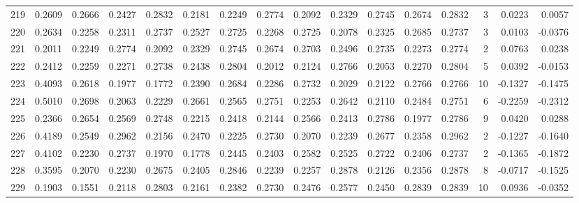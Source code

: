 \begin{tabular}{lrrrrrrrrrrrrrrr}
219 &      0.2609 &  0.2666 &  0.2427 &  0.2832 &  0.2181 &  0.2249 &  0.2774 &  0.2092 &  0.2329 &  0.2745 &   0.2674 &     0.2832 &      3 &                    0.0223 &                     0.0057 \\
220 &      0.2634 &  0.2258 &  0.2311 &  0.2737 &  0.2527 &  0.2725 &  0.2268 &  0.2725 &  0.2078 &  0.2325 &   0.2685 &     0.2737 &      3 &                    0.0103 &                    -0.0376 \\
221 &      0.2011 &  0.2249 &  0.2774 &  0.2092 &  0.2329 &  0.2745 &  0.2674 &  0.2703 &  0.2496 &  0.2735 &   0.2273 &     0.2774 &      2 &                    0.0763 &                     0.0238 \\
222 &      0.2412 &  0.2259 &  0.2271 &  0.2738 &  0.2438 &  0.2804 &  0.2012 &  0.2124 &  0.2766 &  0.2053 &   0.2270 &     0.2804 &      5 &                    0.0392 &                    -0.0153 \\
223 &      0.4093 &  0.2618 &  0.1977 &  0.1772 &  0.2390 &  0.2684 &  0.2286 &  0.2732 &  0.2029 &  0.2122 &   0.2766 &     0.2766 &     10 &                   -0.1327 &                    -0.1475 \\
224 &      0.5010 &  0.2698 &  0.2063 &  0.2229 &  0.2661 &  0.2565 &  0.2751 &  0.2253 &  0.2642 &  0.2110 &   0.2484 &     0.2751 &      6 &                   -0.2259 &                    -0.2312 \\
225 &      0.2366 &  0.2654 &  0.2569 &  0.2748 &  0.2215 &  0.2418 &  0.2144 &  0.2566 &  0.2413 &  0.2786 &   0.1977 &     0.2786 &      9 &                    0.0420 &                     0.0288 \\
226 &      0.4189 &  0.2549 &  0.2962 &  0.2156 &  0.2470 &  0.2225 &  0.2730 &  0.2070 &  0.2239 &  0.2677 &   0.2358 &     0.2962 &      2 &                   -0.1227 &                    -0.1640 \\
227 &      0.4102 &  0.2230 &  0.2737 &  0.1970 &  0.1778 &  0.2445 &  0.2403 &  0.2582 &  0.2525 &  0.2722 &   0.2406 &     0.2737 &      2 &                   -0.1365 &                    -0.1872 \\
228 &      0.3595 &  0.2070 &  0.2230 &  0.2675 &  0.2405 &  0.2846 &  0.2239 &  0.2257 &  0.2878 &  0.2126 &   0.2356 &     0.2878 &      8 &                   -0.0717 &                    -0.1525 \\
229 &      0.1903 &  0.1551 &  0.2118 &  0.2803 &  0.2161 &  0.2382 &  0.2730 &  0.2476 &  0.2577 &  0.2450 &   0.2839 &     0.2839 &     10 &                    0.0936 &                    -0.0352 \\

\end{tabular}
